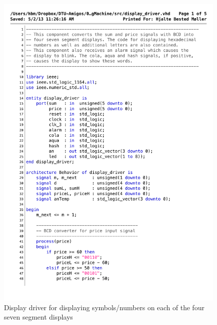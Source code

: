 \begin{figure}[!h]
\centering
\includegraphics[scale=0.7]{figs/display_driver.pdf}
\caption{Display driver for displaying symbols/numbers on each of the four seven segment displays}
\label{vhd:dispdriv1}
\end{figure}

